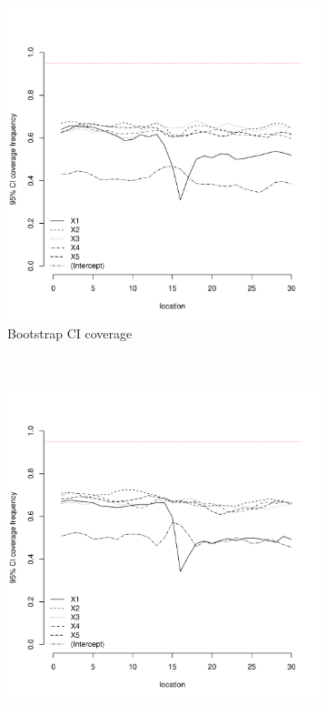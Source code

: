 \documentclass[authoryear, review, 11pt]{elsarticle}
\begin{document}
\begin{figure}
	\vspace{-30mm}
	\centering
	\begin{subfigure}[b]{0.45\textwidth}
	\centering
		\includegraphics[width=\textwidth]{../../figures/simulation/15.23.profile_bootstrap_coverage.pdf}
		\caption{Bootstrap CI coverage}
	\end{subfigure}%
	~ %
	\begin{subfigure}[b]{0.45\textwidth}
	\centering
		\includegraphics[width=\textwidth]{../../figures/simulation/15.23.profile_se_coverage.pdf}

\end{subfigure}
\end{figure}
\end{document}
